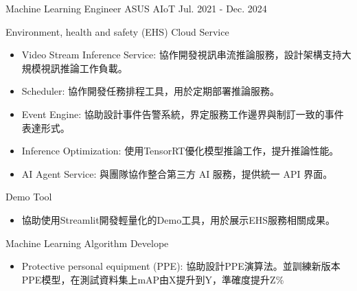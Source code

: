 

\begin{cventries}


  \cventrynew
    {Machine Learning Engineer} %
    {ASUS AIoT} %
    {Jul. 2021 - Dec. 2024} %
    {
      \begin{cvitems} %
        \item {Environment, health and safety (EHS) Cloud Service}
        \begin{itemize}
            \item Video Stream Inference Service: 協作開發視訊串流推論服務，設計架構支持大規模視訊推論工作負載。
            \item Scheduler: 協作開發任務排程工具，用於定期部署推論服務。
            \item Event Engine: 協助設計事件告警系統，界定服務工作邊界與制訂一致的事件表達形式。
            \item Inference Optimization: 使用TensorRT優化模型推論工作，提升推論性能。
            \item AI Agent Service: 與團隊協作整合第三方 AI 服務，提供統一 API 界面。
        \end{itemize}
        \item {Demo Tool}
        \begin{itemize}
            \item 協助使用Streamlit開發輕量化的Demo工具，用於展示EHS服務相關成果。
        \end{itemize}
        \item {Machine Learning Algorithm Develope}
        \begin{itemize}
            \item Protective personal equipment (PPE): 協助設計PPE演算法。並訓練新版本PPE模型，在測試資料集上mAP由X提升到Y，準確度提升Z\%

\end{itemize}
\end{cvitems}}
\end{cventries}
